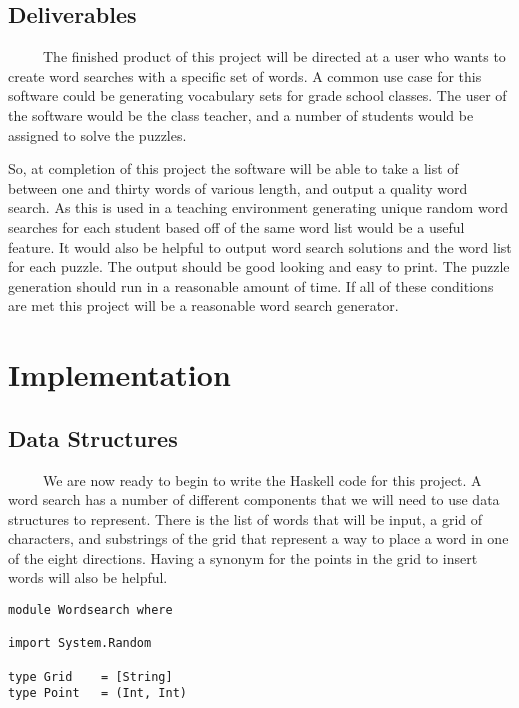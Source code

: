 \documentclass[12pt]{report}   %
\begin{document}
\section*{Deliverables}
    \ \ \ \ \ The finished product of this project will be directed at a user
    who wants to create word searches with a specific set of words. A common
    use case for this software could be generating vocabulary sets for grade 
    school classes. The user of the software would be the class teacher, and a
    number of students would be assigned to solve the puzzles.

    \vspace{12pt}

    So, at completion of this project the software will be able to take a list
    of between one and thirty words of various length, and output a quality
    word search. As this is used in a teaching environment generating unique
    random word searches for each student based off of the same word list would
    be a useful feature. It would also be helpful to output word search 
    solutions and the word list for each puzzle. The output should be good 
    looking and easy to print. The puzzle generation should run in a reasonable
    amount of time. If all of these conditions are met this project will be a
    reasonable word search generator.

\chapter*{Implementation}     %

\section*{Data Structures}         %
    \ \ \ \ \ We are now ready to begin to write the Haskell code for this
    project. A word search has a number of different components that we will
    need to use data structures to represent. There is the list of words that
    will be input, a grid of characters, and substrings of the grid that
    represent a way to place a word in one of the eight directions. Having a
    synonym for the points in the grid to insert words will also be helpful.

    \vspace{12pt}

    \begin{lstlisting}    
module Wordsearch where

import System.Random

type Grid    = [String]
type Point   = (Int, Int)
    \end{lstlisting}
\end{document}
